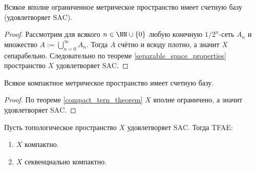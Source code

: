 \documentclass[12pt,a4paper]{article}
\newcommand{\SAC}{\ensuremath{\mathrm{SAC}}\xspace}
\begin{document}
    \begin{theorem}
        Всякое вполне ограниченное метрическое пространство имеет счетную базу (удовлетворяет \SAC).
    \end{theorem}

    \begin{proof}
        Рассмотрим для всякого $n \in \NN \cup \{0\}$ любую конечную $1/2^n$-сеть $A_n$ и множество $A := \bigcup_{n=0}^\infty A_n$. Тогда $A$ счётно и всюду плотно, а значит $X$ сепарабельно. Следовательно по теореме \ref{separable_space_properties} пространство $X$ удовлетворяет \SAC.
    \end{proof}

    \begin{corollary}
        Всякое компактное метрическое пространство имеет счетную базу.
    \end{corollary}

    \begin{proof}
        По теореме \ref{compact_tern_theorem} $X$ вполне ограничено, а значит удовлетворяет \SAC.
    \end{proof}

    \begin{theorem}
        Пусть топологическое пространство $X$ удовлетворяет \SAC. Тогда TFAE:
        \begin{multicols}{2}
            \begin{enumerate}
                \item $X$ компактно.
                \item $X$ секвенциально компактно.
            \end{enumerate}
        \end{multicols}
    \end{theorem}
\end{document}
